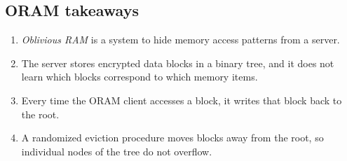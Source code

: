 \subsection{ORAM takeaways}

\begin{enumerate}
\item
  \emph{Oblivious RAM} is a system to hide memory access patterns from a
  server.
\item
  The server stores encrypted data blocks in a binary tree, and it does
  not learn which blocks correspond to which memory items.
\item
  Every time the ORAM client accesses a block, it writes that block back
  to the root.
\item
  A randomized eviction procedure moves blocks away from the root, so
  individual nodes of the tree do not overflow.
\end{enumerate}
